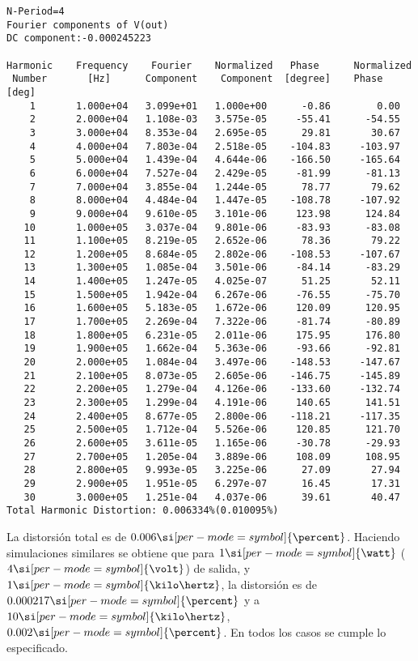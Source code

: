 \fontsize{7pt}{8pt}
\selectfont


\begin{lstlisting}
N-Period=4
Fourier components of V(out)
DC component:-0.000245223

Harmonic	Frequency	 Fourier 	Normalized	 Phase  	Normalized
 Number 	  [Hz]   	Component	 Component	[degree]	Phase [deg]
    1   	1.000e+04	3.099e+01	1.000e+00	   -0.86	    0.00
    2   	2.000e+04	1.108e-03	3.575e-05	  -55.41	  -54.55
    3   	3.000e+04	8.353e-04	2.695e-05	   29.81	   30.67
    4   	4.000e+04	7.803e-04	2.518e-05	 -104.83	 -103.97
    5   	5.000e+04	1.439e-04	4.644e-06	 -166.50	 -165.64
    6   	6.000e+04	7.527e-04	2.429e-05	  -81.99	  -81.13
    7   	7.000e+04	3.855e-04	1.244e-05	   78.77	   79.62
    8   	8.000e+04	4.484e-04	1.447e-05	 -108.78	 -107.92
    9   	9.000e+04	9.610e-05	3.101e-06	  123.98	  124.84
   10   	1.000e+05	3.037e-04	9.801e-06	  -83.93	  -83.08
   11   	1.100e+05	8.219e-05	2.652e-06	   78.36	   79.22
   12   	1.200e+05	8.684e-05	2.802e-06	 -108.53	 -107.67
   13   	1.300e+05	1.085e-04	3.501e-06	  -84.14	  -83.29
   14   	1.400e+05	1.247e-05	4.025e-07	   51.25	   52.11
   15   	1.500e+05	1.942e-04	6.267e-06	  -76.55	  -75.70
   16   	1.600e+05	5.183e-05	1.672e-06	  120.09	  120.95
   17   	1.700e+05	2.269e-04	7.322e-06	  -81.74	  -80.89
   18   	1.800e+05	6.231e-05	2.011e-06	  175.95	  176.80
   19   	1.900e+05	1.662e-04	5.363e-06	  -93.66	  -92.81
   20   	2.000e+05	1.084e-04	3.497e-06	 -148.53	 -147.67
   21   	2.100e+05	8.073e-05	2.605e-06	 -146.75	 -145.89
   22   	2.200e+05	1.279e-04	4.126e-06	 -133.60	 -132.74
   23   	2.300e+05	1.299e-04	4.191e-06	  140.65	  141.51
   24   	2.400e+05	8.677e-05	2.800e-06	 -118.21	 -117.35
   25   	2.500e+05	1.712e-04	5.526e-06	  120.85	  121.70
   26   	2.600e+05	3.611e-05	1.165e-06	  -30.78	  -29.93
   27   	2.700e+05	1.205e-04	3.889e-06	  108.09	  108.95
   28   	2.800e+05	9.993e-05	3.225e-06	   27.09	   27.94
   29   	2.900e+05	1.951e-05	6.297e-07	   16.45	   17.31
   30   	3.000e+05	1.251e-04	4.037e-06	   39.61	   40.47
Total Harmonic Distortion: 0.006334%(0.010095%)

\end{lstlisting}

\normalfont
\normalsize


La distorsión total es de $0.006 \si[per-mode=symbol]{\percent}$. Haciendo simulaciones similares se obtiene que para $1 \si[per-mode=symbol]{\watt}$ ($4 \si[per-mode=symbol]{\volt}$) de salida, y $1 \si[per-mode=symbol]{\kilo\hertz}$, la distorsión es de $0.000217 \si[per-mode=symbol]{\percent}$ y a $10 \si[per-mode=symbol]{\kilo\hertz}$, $0.002 \si[per-mode=symbol]{\percent}$. En todos los casos se cumple lo especificado.




